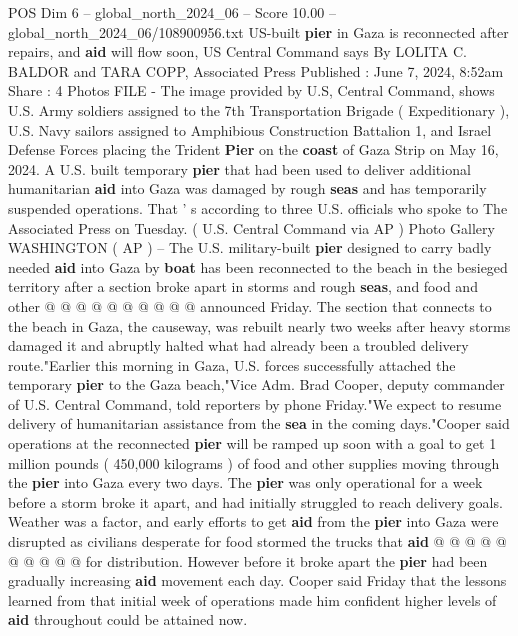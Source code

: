 \begin{textsample}{POS Dim 6 – global\_north\_2024\_06 – Score 10.00 – global\_north\_2024\_06/108900956.txt}  \label{ex:f6_pos_131}
US-built \textbf{pier} in Gaza is reconnected after repairs, and \textbf{aid} will flow soon, US Central Command says By LOLITA C.
BALDOR and TARA COPP, Associated Press Published : June 7, 2024, 8:52am Share : 4 Photos FILE - The image provided by U.S, Central Command, shows U.S.
Army soldiers assigned to the 7th Transportation Brigade ( Expeditionary ), U.S.
Navy sailors assigned to Amphibious Construction Battalion 1, and Israel Defense Forces placing the Trident \textbf{Pier} on the \textbf{coast} of Gaza Strip on May 16, 2024.
A U.S. built temporary \textbf{pier} that had been used to deliver additional humanitarian \textbf{aid} into Gaza was damaged by rough \textbf{seas} and has temporarily suspended operations.
That ' s according to three U.S. officials who spoke to The Associated Press on Tuesday. ( U.S.
Central Command via AP ) Photo Gallery WASHINGTON ( AP ) -- The U.S. military-built \textbf{pier} designed to carry badly needed \textbf{aid} into Gaza by \textbf{boat} has been reconnected to the beach in the besieged territory after a section broke apart in storms and rough \textbf{seas}, and food and other @ @ @ @ @ @ @ @ @ @ announced Friday.
The section that connects to the beach in Gaza, the causeway, was rebuilt nearly two weeks after heavy storms damaged it and abruptly halted what had already been a troubled delivery route."Earlier this morning in Gaza, U.S. forces successfully attached the temporary \textbf{pier} to the Gaza beach,"Vice Adm.
Brad Cooper, deputy commander of U.S.
Central Command, told reporters by phone Friday."We expect to resume delivery of humanitarian assistance from the \textbf{sea} in the coming days."Cooper said operations at the reconnected \textbf{pier} will be ramped up soon with a goal to get 1 million pounds ( 450,000 kilograms ) of food and other supplies moving through the \textbf{pier} into Gaza every two days.
The \textbf{pier} was only operational for a week before a storm broke it apart, and had initially struggled to reach delivery goals.
Weather was a factor, and early efforts to get \textbf{aid} from the \textbf{pier} into Gaza were disrupted as civilians desperate for food stormed the trucks that \textbf{aid} @ @ @ @ @ @ @ @ @ @ for distribution.
However before it broke apart the \textbf{pier} had been gradually increasing \textbf{aid} movement each day.
Cooper said Friday that the lessons learned from that initial week of operations made him confident higher levels of \textbf{aid} throughout could be attained now.

\end{textsample}
